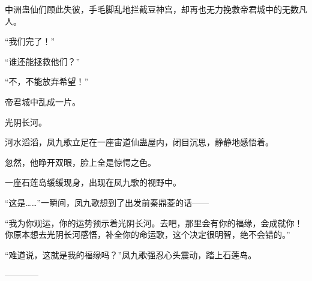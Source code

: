 \begin{this_body}
中洲蛊仙们顾此失彼，手毛脚乱地拦截豆神宫，却再也无力挽救帝君城中的无数凡人。

“我们完了！”

“谁还能拯救他们？”

“不，不能放弃希望！”

帝君城中乱成一片。

光阴长河。

河水滔滔，凤九歌立足在一座宙道仙蛊屋内，闭目沉思，静静地感悟着。

忽然，他睁开双眼，脸上全是惊愕之色。

一座石莲岛缓缓现身，出现在凤九歌的视野中。

“这是……”一瞬间，凤九歌想到了出发前秦鼎菱的话——

“我为你观运，你的运势预示着光阴长河。去吧，那里会有你的福缘，会成就你！你原本想去光阴长河感悟，补全你的命运歌，这个决定很明智，绝不会错的。”

“难道说，这就是我的福缘吗？”凤九歌强忍心头震动，踏上石莲岛。

------------

\end{this_body}

